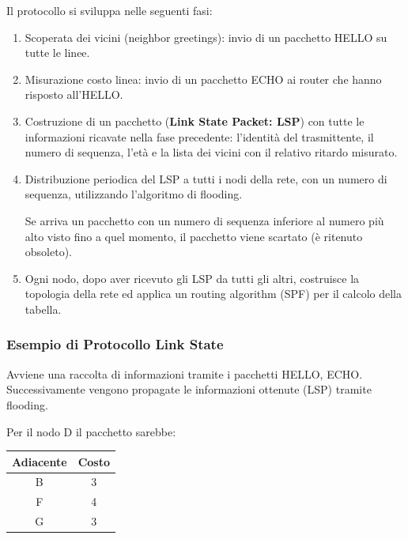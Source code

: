             Il protocollo si sviluppa nelle seguenti fasi:
            \begin{enumerate}
                \item Scoperata dei vicini (neighbor greetings): invio di un pacchetto HELLO su tutte le linee.
                \item Misurazione costo linea: invio di un pacchetto ECHO ai router che hanno risposto all'HELLO.
                \item Costruzione di un pacchetto (\textbf{Link State Packet: LSP}) con tutte le informazioni ricavate nella fase precedente: l'identità del trasmittente, il numero di sequenza, l'età e la lista dei vicini con il relativo ritardo misurato.
                \item Distribuzione periodica del LSP a tutti i nodi della rete, con un numero di sequenza, utilizzando l'algoritmo di flooding.
                
                Se arriva un pacchetto con un numero di sequenza inferiore al numero più alto visto fino a quel momento, il pacchetto viene scartato (è ritenuto obsoleto).
                \item Ogni nodo, dopo aver ricevuto gli LSP da tutti gli altri, costruisce la topologia della rete ed applica un routing algorithm (SPF) per il calcolo della tabella.
            \end{enumerate}

        \subsubsection{Esempio di Protocollo Link State}
            

            Avviene una raccolta di informazioni tramite i pacchetti HELLO, ECHO. Successivamente vengono propagate le informazioni ottenute (LSP) tramite flooding.

            Per il nodo D il pacchetto sarebbe:

            \begin{table}[h]
                \centering
                \begin{tabular}{|c|c|}
                \hline
                \rowcolor[HTML]{000000} 
                {\color[HTML]{EFEFEF} \textbf{Adiacente}} & {\color[HTML]{EFEFEF} \textbf{Costo}} \\ \hline
                B & 3 \\ \hline
                F & 4 \\ \hline
                G & 3 \\ \hline
                \end{tabular}
            \end{table}

